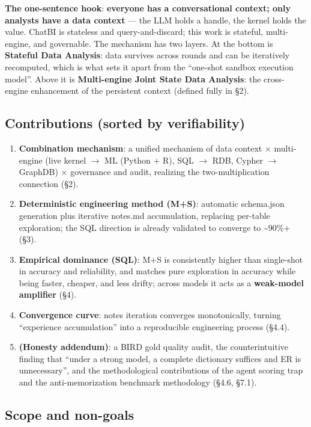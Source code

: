 \documentclass[11pt]{article}
\begin{document}
\textbf{The one-sentence hook}: \textbf{everyone has a conversational context; only analysts have a data context} --- the LLM holds a handle, the kernel holds the value. ChatBI is stateless and query-and-discard; this work is stateful, multi-engine, and governable. The mechanism has two layers. At the bottom is \textbf{Stateful Data Analysis}: data survives across rounds and can be iteratively recomputed, which is what sets it apart from the ``one-shot sandbox execution model''. Above it is \textbf{Multi-engine Joint State Data Analysis}: the cross-engine enhancement of the persistent context (defined fully in \S{}2).

\subsection{Contributions (sorted by verifiability)}

\begin{enumerate}
\def\labelenumi{\arabic{enumi}.}
\item
  \textbf{Combination mechanism}: a unified mechanism of data context $\times$ multi-engine (live kernel $\rightarrow$ ML (Python + R), SQL $\rightarrow$ RDB, Cypher $\rightarrow$ GraphDB) $\times$ governance and audit, realizing the two-multiplication connection (\S{}2).
\item
  \textbf{Deterministic engineering method (M+S)}: automatic schema.json generation plus iterative notes.md accumulation, replacing per-table exploration; the SQL direction is already validated to converge to \textasciitilde90\%+ (\S{}3).
\item
  \textbf{Empirical dominance (SQL)}: M+S is consistently higher than single-shot in accuracy and reliability, and matches pure exploration in accuracy while being faster, cheaper, and less drifty; across models it acts as a \textbf{weak-model amplifier} (\S{}4).
\item
  \textbf{Convergence curve}: notes iteration converges monotonically, turning ``experience accumulation'' into a reproducible engineering process (\S{}4.4).
\item
  \textbf{(Honesty addendum)}: a BIRD gold quality audit, the counterintuitive finding that ``under a strong model, a complete dictionary suffices and ER is unnecessary'', and the methodological contributions of the agent scoring trap and the anti-memorization benchmark methodology (\S{}4.6, \S{}7.1).
\end{enumerate}

\subsection{Scope and non-goals}
\end{document}

